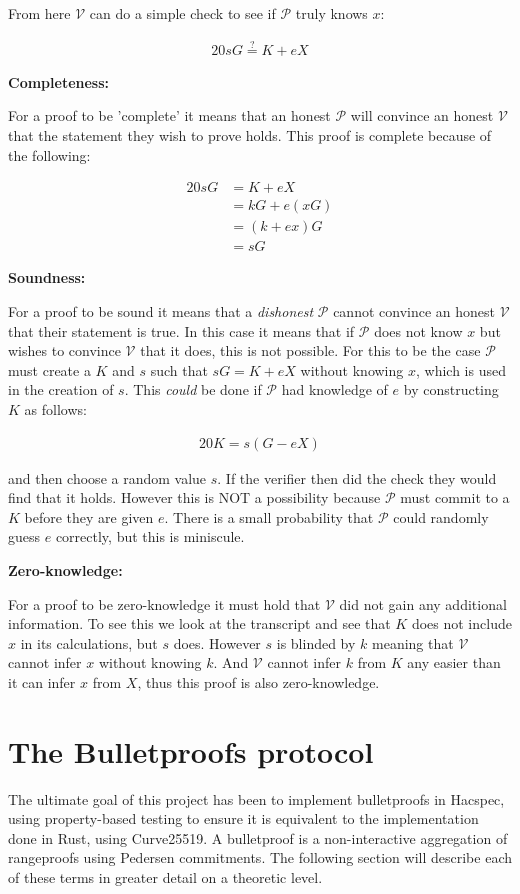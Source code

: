 \documentclass{article}
\newcommand{\eq}[1]{\begin{alignat*}{20}#1\end{alignat*}}
\newcommand{\V}{\mathcal{V}}
\renewcommand{\P}{\mathcal{P}}
\begin{document}
From here $\V$ can do a simple check to see if $\P$ truly knows $x$:

\eq{
	sG \stackrel{?}{=} K + eX
}


\textbf{Completeness:}

For a proof to be 'complete' it means that an honest $\P$ will convince
an honest $\V$ that the statement they wish to prove holds. This proof
is complete because of the following:

\eq{
	sG &= K + eX \\
	   &= kG + e(xG) \\
	   &= (k + ex)G \\
	   &= sG
}

\textbf{Soundness:}

For a proof to be sound it means that a \textit{dishonest} $\P$
cannot convince an honest $\V$ that their statement is true. In this
case it means that if $\P$ does not know $x$ but wishes to convince
$\V$ that it does, this is not possible. For this to be the case $\P$
must create a $K$ and $s$ such that $sG = K + eX$ without knowing $x$,
which is used in the creation of $s$. This \textit{could} be done if
$\P$ had knowledge of $e$ by constructing $K$ as follows:

\eq{
	K = s(G - eX)
}

and then choose a random value $s$. If the verifier then did the check
they would find that it holds. However this is NOT a possibility
because $\P$ must commit to a $K$ before they are given $e$. There
is a small probability that $\P$ could randomly guess $e$ correctly,
but this is miniscule.

\textbf{Zero-knowledge:}

For a proof to be zero-knowledge it must hold that $\V$ did not gain any additional information. To see this we look at the transcript and see that $K$ does not include $x$ in its calculations, but $s$ does. However $s$ is blinded by $k$ meaning that $\V$ cannot infer $x$ without knowing $k$. And $\V$ cannot infer $k$ from $K$ any easier than it can infer $x$ from $X$, thus this proof is also zero-knowledge. 

\section{The Bulletproofs protocol} \label{Bulletproofs}

The ultimate goal of this project has been to implement bulletproofs in
Hacspec, using property-based testing to ensure it is equivalent to the
implementation done in Rust, using Curve25519. A bulletproof is a
non-interactive aggregation of rangeproofs using Pedersen commitments.
The following section will describe each of these terms in greater detail
on a theoretic level.
\end{document}
